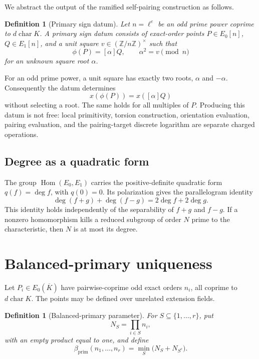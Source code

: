 \documentclass[11pt]{article}
\newtheorem{definition}[theorem]{Definition}
\newcommand{\Z}{\mathbb{Z}}
\newcommand{\Kbar}{\overline{K}}
\newcommand{\betaP}{\beta_{\mathrm{prim}}}
\begin{document}
We abstract the output of the ramified self-pairing construction as follows.

\begin{definition}[Primary sign datum]
Let $n=\ell^e$ be an odd prime power coprime to $d\operatorname{char}K$.
A primary sign datum consists of exact-order points
$P\in E_0[n]$, $Q\in E_1[n]$, and a unit square
$v\in(\Z/n\Z)^\times$ such that
\[
  \phi(P)=[\alpha]Q,\qquad \alpha^2=v\pmod n
\]
for an unknown square root $\alpha$.
\end{definition}

For an odd prime power, a unit square has exactly two roots, $\alpha$ and
$-\alpha$.  Consequently the datum determines
\[
  x(\phi(P))=x([\alpha]Q)
\]
without selecting a root.  The same holds for all multiples of $P$.
Producing this datum is not free: local primitivity, torsion construction,
orientation evaluation, pairing evaluation, and the pairing-target discrete
logarithm are separate charged operations.

\subsection{Degree as a quadratic form}

The group $\operatorname{Hom}(E_0,E_1)$ carries the positive-definite
quadratic form $q(f)=\deg f$, with $q(0)=0$.  Its polarization gives the
parallelogram identity
\begin{equation}\label{eq:parallelogram}
 \deg(f+g)+\deg(f-g)=2\deg f+2\deg g.
\end{equation}
This identity holds independently of the separability of $f+g$ and $f-g$.
If a nonzero homomorphism kills a reduced subgroup of order $N$ prime to the
characteristic, then $N$ is at most its degree.

\section{Balanced-primary uniqueness}

Let $P_i\in E_0(\Kbar)$ have pairwise-coprime odd exact orders $n_i$, all
coprime to $d\operatorname{char}K$.  The points may be defined over unrelated
extension fields.

\begin{definition}[Balanced-primary parameter]
For $S\subseteq\{1,\ldots,r\}$, put
\[
 N_S=\prod_{i\in S}n_i,
\]
with an empty product equal to one, and define
\[
 \betaP(n_1,\ldots,n_r)
 =\min_S\bigl(N_S+N_{S^c}\bigr).
\]
\end{definition}
\end{document}

